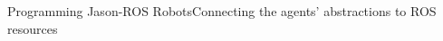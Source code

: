 \documentclass[compress]{beamer}
\begin{document}
\begin{frame}[fragile]{Programming Jason-ROS Robots}{Connecting the agents' abstractions to ROS resources}
\begin{columns}
 
 
 
\end{columns}



\end{frame}
\end{document}
